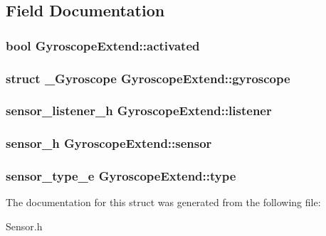\subsection{Field Documentation}
\subsubsection[{activated}]{\setlength{\rightskip}{0pt plus 5cm}bool Gyroscope\-Extend\-::activated}\label{structGyroscopeExtend_aecadafbf1e6d090ae7e7c31893cf2b25}
\subsubsection[{gyroscope}]{\setlength{\rightskip}{0pt plus 5cm}struct {\bf \-\_\-\-Gyroscope} Gyroscope\-Extend\-::gyroscope}\label{structGyroscopeExtend_a31add53e20f597df9a5ffc6e2c9c4b44}
\subsubsection[{listener}]{\setlength{\rightskip}{0pt plus 5cm}sensor\-\_\-listener\-\_\-h Gyroscope\-Extend\-::listener}\label{structGyroscopeExtend_a1361f8e890d1ce164003739633ba0eb6}
\subsubsection[{sensor}]{\setlength{\rightskip}{0pt plus 5cm}sensor\-\_\-h Gyroscope\-Extend\-::sensor}\label{structGyroscopeExtend_a8c4247b5ce44a1aef6393f9ba0975b22}
\subsubsection[{type}]{\setlength{\rightskip}{0pt plus 5cm}sensor\-\_\-type\-\_\-e Gyroscope\-Extend\-::type}\label{structGyroscopeExtend_aa4086bb72f9600a7b3b43e90cd52076b}


The documentation for this struct was generated from the following file\-:\begin{DoxyCompactItemize}
\item 
Sensor.\-h\end{DoxyCompactItemize}
